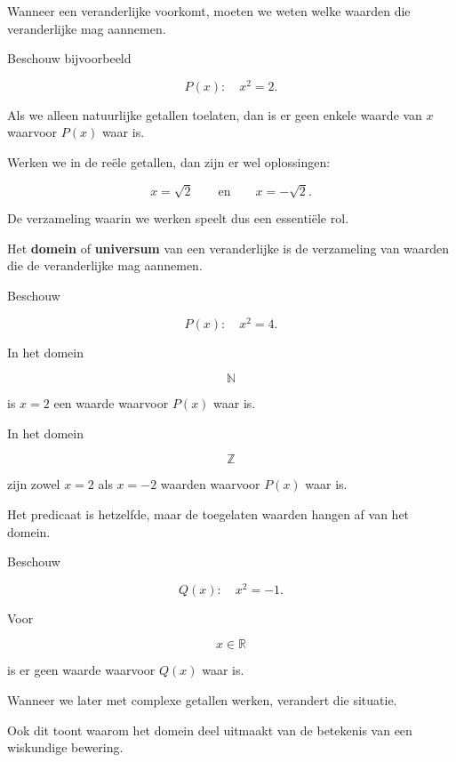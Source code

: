 \documentclass{ximera}
\begin{document}
Wanneer een veranderlijke voorkomt, moeten we weten welke waarden die
veranderlijke mag aannemen.

Beschouw bijvoorbeeld

\[
P(x):\quad x^2=2.
\]

Als we alleen natuurlijke getallen toelaten, dan is er geen enkele
waarde van $x$ waarvoor $P(x)$ waar is.

Werken we in de reële getallen, dan zijn er wel oplossingen:

\[
x=\sqrt{2}
\qquad\text{en}\qquad
x=-\sqrt{2}.
\]

De verzameling waarin we werken speelt dus een essentiële rol.


\begin{definitie}
Het \textbf{domein} of \textbf{universum} van een veranderlijke is
de verzameling van waarden die de veranderlijke mag aannemen.
\end{definitie}


\begin{voorbeeld}

Beschouw

\[
P(x):\quad x^2=4.
\]

In het domein

\[
\mathbb{N}
\]

is $x=2$ een waarde waarvoor $P(x)$ waar is.

In het domein

\[
\mathbb{Z}
\]

zijn zowel $x=2$ als $x=-2$ waarden waarvoor $P(x)$ waar is.

Het predicaat is hetzelfde, maar de toegelaten waarden hangen af
van het domein.
\end{voorbeeld}


\begin{voorbeeld}

Beschouw

\[
Q(x):\quad x^2=-1.
\]

Voor

\[
x\in\mathbb{R}
\]

is er geen waarde waarvoor $Q(x)$ waar is.

Wanneer we later met complexe getallen werken, verandert die situatie.

Ook dit toont waarom het domein deel uitmaakt van de betekenis van
een wiskundige bewering.
\end{voorbeeld}
\end{document}
